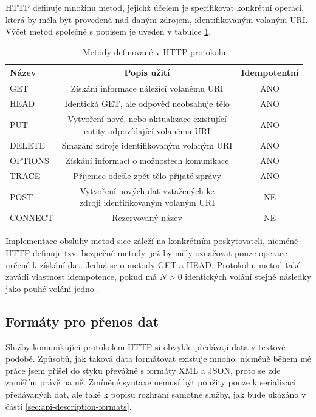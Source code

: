 \documentclass[czech,DP]{thesiskiv}
\begin{document}
HTTP definuje množinu metod, jejichž účelem je specifikovat konkrétní operaci, která by měla být provedená nad daným zdrojem, identifikovaným volaným URI. Výčet metod společně s popisem je uveden v tabulce \ref{tab:http-methods}.

\begin{table}[h]
	\centering
	\begin{tabular}{|l|c|c|}
		\hline
		Název & Popis užití & Idempotentní \\
		\hline
		\hline
		GET & Získání informace náležící volanému URI & ANO \\
		\hline
		HEAD & Identická GET, ale odpověď neobsahuje tělo & ANO \\
		\hline
		PUT & \makecell{Vytvoření nové, nebo aktualizace existující \\ entity odpovídající volanému URI }  & ANO \\
		\hline
		DELETE & Smazání zdroje identifikovaným volaným URI & ANO \\
		\hline
		OPTIONS & Získání informací o možnostech komunikace  & ANO \\
		\hline
		TRACE & Příjemce odešle zpět tělo přijaté zprávy & ANO \\
		\hline
		POST & \makecell{Vytvoření nových dat vztažených ke \\ zdroji identifikovaným volaným URI} & NE \\
		\hline
		CONNECT & Rezervovaný název & NE \\
		\hline		
	\end{tabular}
	\caption{Metody definované v HTTP protokolu}
	\label{tab:http-methods}
\end{table}

Implementace obsluhy metod sice záleží na konkrétním poskytovateli, nicméně HTTP definuje tzv. bezpečné metody, jež by měly označovat pouze operace určené k získání dat. Jedná se o metody GET a HEAD. Protokol u metod také zavádí vlastnost idempotence, pokud má $N>0$ identických volání stejné následky jako pouhé volání jedno \cite{httpRfc}.


\subsection{Formáty pro přenos dat}

Služby komunikující protokolem HTTP si obvykle předávají data v textové podobě. Způsobů, jak taková data formátovat existuje mnoho, nicméně během mé práce jsem přišel do styku převážně s formáty XML a JSON, proto se zde zaměřím právě na ně. Zmíněné syntaxe nemusí být použity pouze k serializaci předávaných dat, ale také k popisu rozhraní samotné služby, jak bude ukázáno v části \ref{sec:api-description-formats}.
\end{document}
